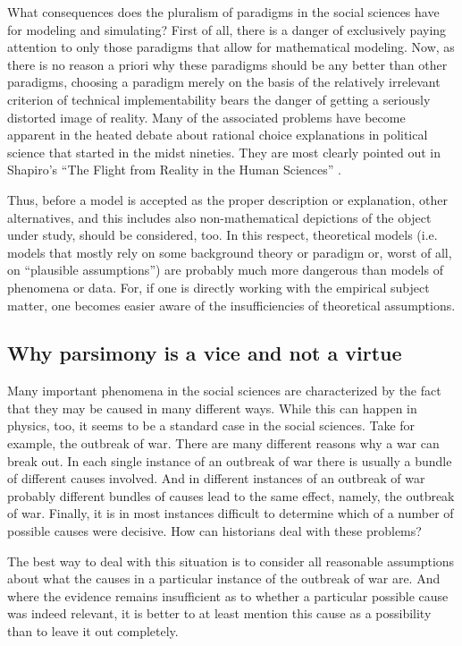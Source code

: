\documentclass[onecollarge]{STJour}
\numberwithin{equation}{section}
\begin{document}
What consequences does the pluralism of paradigms in the social sciences
have for modeling and simulating? First of all, there is a danger of
exclusively paying attention to only those paradigms that allow for
mathematical modeling. Now, as there is no reason a priori why these
paradigms should be any better than other paradigms, choosing a paradigm
merely on the basis of the relatively irrelevant criterion of technical
implementability bears the danger of getting a seriously distorted image
of reality. Many of the associated problems have become
apparent in the heated debate about rational choice explanations in
political science that started in the midst nineties. They are most
clearly pointed out in Shapiro's ``The Flight from Reality in the Human
Sciences'' \citeyearpar{shapiro:2005}.

Thus, before a model is accepted as the proper description or
explanation, other alternatives, and this includes also non-mathematical
depictions of the object under study, should be considered, too. In this
respect, theoretical models (i.e. models that mostly rely on some
background theory or paradigm or, worst of all, on ``plausible
assumptions'') are probably much more dangerous than models of phenomena
or data. For, if one is directly working with the empirical subject
matter, one becomes easier aware of the insufficiencies of theoretical
assumptions.


\subsection{Why parsimony is a vice and not a virtue} 

Many important phenomena in the social sciences are characterized by the
fact that they may be caused in many different ways. While this can
happen in physics, too, it seems to be a standard case in the social
sciences. Take for example, the outbreak of war. There are many different
reasons why a war can break out. In each single instance of an outbreak
of war there is usually a bundle of different causes involved. And in
different instances of an outbreak of war probably different bundles of
causes lead to the same effect, namely, the outbreak of war. Finally, it
is in most instances difficult to determine which of a number of possible
causes were decisive. How
can historians deal with these problems?

The best way to deal with this situation is to consider all reasonable
assumptions about what the causes in a particular instance of the
outbreak of war are. And where the evidence remains insufficient as to
whether a particular possible cause was indeed relevant, it is better to
at least mention this cause as a possibility than to leave it out
completely.
\end{document}
